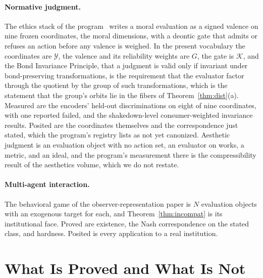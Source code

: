 \documentclass[11pt]{article}
\theoremstyle{definition}
\theoremstyle{remark}
\newcommand{\K}{\mathcal{K}}
\newcommand{\Y}{\mathcal{Y}}
\begin{document}
\paragraph{Normative judgment.}
The ethics stack of the program~\cite{bond2026encyclopedia} writes a moral evaluation as a signed valence on nine frozen coordinates, the moral dimensions, with a deontic gate that admits or refuses an action before any valence is weighed.
In the present vocabulary the coordinates are $\Y$, the valence and its reliability weights are $G$, the gate is $\K$, and the Bond Invariance Principle, that a judgment is valid only if invariant under bond-preserving transformations, is the requirement that the evaluator factor through the quotient by the group of such transformations, which is the statement that the group's orbits lie in the fibers of Theorem~\ref{thm:dist}(a).
Measured are the encoders' held-out discriminations on eight of nine coordinates, with one reported failed, and the shakedown-level consumer-weighted invariance results.
Posited are the coordinates themselves and the correspondence just stated, which the program's registry lists as not yet canonized.
Aesthetic judgment is an evaluation object with no action set, an evaluator on works, a metric, and an ideal, and the program's measurement there is the compressibility result of the aesthetics volume, which we do not restate.

\paragraph{Multi-agent interaction.}
The behavioral game of the observer-representation paper is $N$ evaluation objects with an exogenous target for each, and Theorem~\ref{thm:incompat} is its institutional face.
Proved are existence, the Nash correspondence on the stated class, and hardness.
Posited is every application to a real institution.

\section{What Is Proved and What Is Not}
\end{document}
